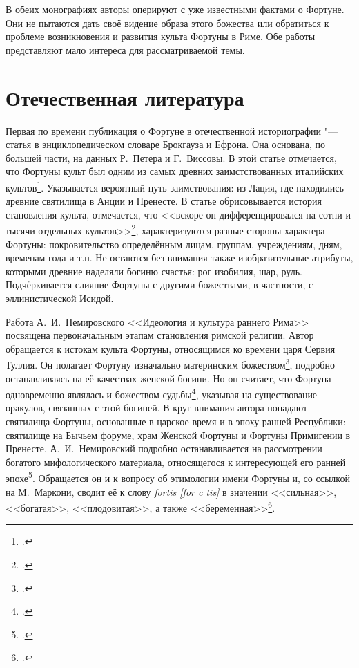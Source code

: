 В обеих монографиях авторы оперируют с уже известными фактами о Фортуне. Они не пытаются дать своё видение образа этого божества или обратиться к проблеме возникновения и развития культа Фортуны в Риме. Обе работы представляют мало интереса для рассматриваемой темы.

\section*{Отечественная литература}
{}


Первая по времени публикация о Фортуне в отечественной историографии "--- статья в энциклопедическом словаре Брокгауза и Ефрона. Она основана, по большей части, на данных Р.~Петера и Г.~Виссовы. В этой статье отмечается, что Фортуны культ был одним из самых древних заимстствованных италийских культов\footcite[С. 320--321]{ESBE1902}. Указывается вероятный путь заимствования: из Лация, где находились древние святилища в Анции и Пренесте. В статье обрисовывается история становления культа, отмечается, что <<вскоре он дифференцировался на сотни и тысячи отдельных культов>>\footcite[С. 320--321]{ESBE1902}, характеризуются разные стороны характера Фортуны: покровительство определённым лицам, группам, учреждениям, дням, временам года и т.п. Не остаются без внимания также изобразительные атрибуты, которыми древние наделяли богиню счастья: рог изобилия, шар, руль. Подчёркивается слияние Фортуны с другими божествами, в частности, с эллинистической Исидой.


Работа А.~И.~Немировского <<Идеология и культура раннего Рима>> посвящена первоначальным этапам становления римской религии. Автор обращается к истокам культа Фортуны, относящимся ко времени царя Сервия Туллия. Он полагает Фортуну изначально материнским божеством\footcite[С. 62]{Nemirovsky1964}, подробно останавливаясь на её качествах женской богини. Но он считает, что Фортуна одновременно являлась и божеством судьбы\footcite[С. 74]{Nemirovsky1964}, указывая на существование оракулов, связанных с этой богиней. В круг внимания автора попадают святилища Фортуны, основанные в царское время и в эпоху ранней Республики: святилище на Бычьем форуме, храм Женской Фортуны и Фортуны Примигении в Пренесте. А.~И.~Немировский подробно останавливается на рассмотрении богатого мифологического материала, относящегося к интересующей его ранней эпохе\footcite[С. 73--74]{Nemirovsky1964}. Обращается он и к вопросу об этимологии имени Фортуны и, со ссылкой на М.~Маркони, сводит её к слову \textit{fortis [for c tis]} в значении <<сильная>>, <<богатая>>, <<плодовитая>>, а также <<беременная>>\footcite[С. 72]{Nemirovsky1964}.


